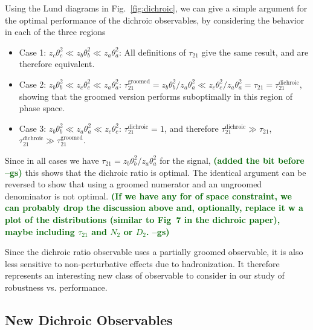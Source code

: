 \documentclass[11pt,letterpaper]{article}
\newcommand{\dichroic}{\text{dichroic}}
\newcommand{\groomed}{\text{groomed}}
\DeclareRobustCommand{\Fig}[1]{Fig.~\ref{#1}}
\newcommand{\gs}[1]{\textbf{\textcolor{darkgreen}{(#1 --gs)}}}
\begin{document}
Using the Lund diagrams in \Fig{fig:dichroic}, we can give a simple argument for the optimal performance of the dichroic observables, by considering the behavior in each of the three regions
\begin{itemize}
\item Case 1: $z_c \theta_c^2 \ll z_b \theta_b^2 \ll z_a \theta_a^2$: All definitions of $\tau_{21}$ give the same result, and are therefore equivalent.
\item Case 2: $z_b\theta_b^2 \ll z_c \theta_c^2 \ll z_a \theta_a^2$: $\tau_{21}^\groomed=z_b \theta_b^2/z_a \theta_a^2 \ll  z_c \theta_c^2/z_a \theta_a^2=\tau_{21}=\tau_{21}^\dichroic$, showing that the groomed version performs suboptimally in this region of phase space.
\item Case 3: $z_b \theta_b^2 \ll z_a \theta_a^2 \ll z_c \theta_c^2$: $\tau_{21}^\dichroic=1$, and therefore $\tau_{21}^\dichroic \gg \tau_{21}$, $\tau_{21}^\dichroic \gg \tau_{21}^\groomed$. 
\end{itemize}
Since in all cases we have $\tau_{21}=z_b\theta_b^2/z_a\theta_a^2$ for
the signal, \gs{added the bit before} this shows that the dichroic
ratio is optimal. The identical argument can be reversed to show that
using a groomed numerator and an ungroomed denominator is not optimal.
\gs{If we have any for of space constraint, we can probably drop the
  discussion above and, optionally, replace it w a plot of the
  distributions (similar to Fig~7 in the dichroic paper), maybe
  including $\tau_{21}$ and $N_2$ or $D_2$.}

Since the dichroic ratio observable uses a partially groomed observable, it is also less sensitive to non-perturbative effects due to hadronization. It therefore represents an interesting new class of observable to consider in our study of robustness vs. performance. 







\subsection{New Dichroic Observables}\label{sec:dichroic_new}
\end{document}
